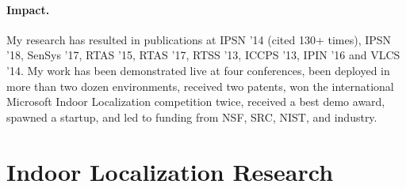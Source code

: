 \documentclass[10pt]{article}
\begin{document}





\paragraph{Impact. }
My research has resulted in publications at IPSN '14 (cited 130+ times), IPSN '18, SenSys '17, RTAS '15, RTAS '17, RTSS '13, ICCPS '13, IPIN '16 and VLCS '14. My work has been demonstrated live at four conferences, been deployed in more than two dozen environments, received two patents, won the international Microsoft Indoor Localization competition twice, received a best demo award, spawned a startup, and led to funding from NSF, SRC, NIST, and industry. %


\section{Indoor Localization Research}
\end{document}
